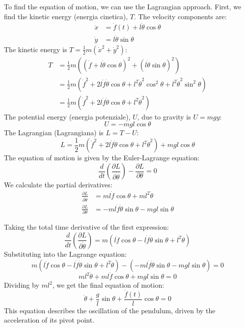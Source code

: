 To find the equation of motion, we can use the Lagrangian approach. First, we find the kinetic energy (energia cinetica), $T$. The velocity components are:
\begin{align*}
    \dot{x} &= \dot{f}(t) + l\dot{\theta}\cos\theta \\
    \dot{y} &= l\dot{\theta}\sin\theta
\end{align*}
The kinetic energy is $T = \frac{1}{2}m(\dot{x}^2 + \dot{y}^2)$: 
\begin{align*}
    T &= \frac{1}{2}m\left( (\dot{f} + l\dot{\theta}\cos\theta)^2 + (l\dot{\theta}\sin\theta)^2 \right) \\
    &= \frac{1}{2}m\left( \dot{f}^2 + 2l\dot{f}\dot{\theta}\cos\theta + l^2\dot{\theta}^2\cos^2\theta + l^2\dot{\theta}^2\sin^2\theta \right) \\
    &= \frac{1}{2}m\left( \dot{f}^2 + 2l\dot{f}\dot{\theta}\cos\theta + l^2\dot{\theta}^2 \right)
\end{align*}
The potential energy (energia potenziale), $U$, due to gravity is $U = mgy$: 
\[
    U = -mgl\cos\theta
\]
The Lagrangian (Lagrangiana) is $L = T - U$: 
\[
    L = \frac{1}{2}m(\dot{f}^2 + 2l\dot{f}\dot{\theta}\cos\theta + l^2\dot{\theta}^2) + mgl\cos\theta
\]
The equation of motion is given by the Euler-Lagrange equation: 
\[
    \frac{d}{dt}\left(\frac{\partial L}{\partial\dot{\theta}}\right) - \frac{\partial L}{\partial\theta} = 0
\]
We calculate the partial derivatives:
\begin{align*}
    \frac{\partial L}{\partial\dot{\theta}} &= ml\dot{f}\cos\theta + ml^2\dot{\theta} \\
    \frac{\partial L}{\partial\theta} &= -ml\dot{f}\dot{\theta}\sin\theta - mgl\sin\theta
\end{align*}


Taking the total time derivative of the first expression: 
\[
    \frac{d}{dt}\left(\frac{\partial L}{\partial\dot{\theta}}\right) = m(l\ddot{f}\cos\theta - l\dot{f}\dot{\theta}\sin\theta + l^2\ddot{\theta})
\]
Substituting into the Lagrange equation: 
\[
    m(l\ddot{f}\cos\theta - l\dot{f}\dot{\theta}\sin\theta + l^2\ddot{\theta}) - (-ml\dot{f}\dot{\theta}\sin\theta - mgl\sin\theta) = 0
\]
\[
    ml^2\ddot{\theta} + ml\ddot{f}\cos\theta + mgl\sin\theta = 0
\]
Dividing by $ml^2$, we get the final equation of motion: 
\[
    \ddot{\theta} + \frac{g}{l}\sin\theta + \frac{\ddot{f}(t)}{l}\cos\theta = 0
\]
This equation describes the oscillation of the pendulum, driven by the acceleration of its pivot point.
